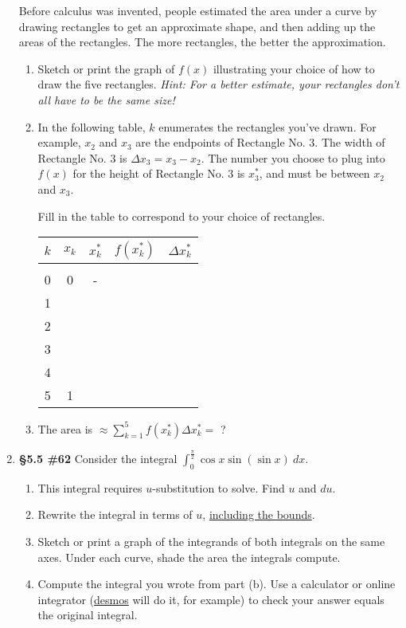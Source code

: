 \documentclass[%
]{article}
\begin{document}
\begin{enumerate}
\hspace{5pt} Before calculus was invented, people estimated the area under a curve by drawing rectangles to get an approximate shape, and then adding up the areas of the rectangles.  The more rectangles, the better the approximation.
  
	\begin{enumerate}
	\item Sketch or print the graph of $f(x)$ illustrating your choice of how to draw the five rectangles.  \textit{Hint: For a better estimate, your rectangles don't all have to be the same size!}
	\item In the following table, $k$ enumerates the rectangles you've drawn.  For example, $x_2$ and $x_3$ are the endpoints of Rectangle No. 3.  The width of Rectangle No. 3 is $\Delta x_3=x_3-x_2$.  The number you choose to plug into $f(x)$ for the height of Rectangle No. 3 is $x_3^*$, and must be between $x_2$ and $x_3$.  
	
	\vspace{0.5pc}
	Fill in the table to correspond to your choice of rectangles.
	\begin{center}
	\begin{tabular}{c | c | c | c | c}
	$k$ & $x_k$ & $x_k^*$ & $f(x_k^*)$ & $\Delta x_k^*$ \\[0.25pc]
	\hline
	 & & & & \\[-0.75pc]
	0 & 0 & - & & \\[0.25pc]
	1 & & & & \\[0.25pc]
	2 & & & & \\[0.25pc]
	3 & & & & \\[0.25pc]
	4 & & & & \\[0.25pc]
	5 & 1 & & & 
	\end{tabular}
	\end{center}
	
	\item The area is $\displaystyle \approx \sum_{k=1}^5f(x_k^*)\Delta x_k^*=$ ?
	
	\end{enumerate}
	
\item {\bf \S5.5 \#62} Consider the integral $\displaystyle \int_0^{\frac{\pi}{2}}\cos x \sin(\sin x)\ dx$. 
	\begin{enumerate}
	\item This integral requires $u$-substitution to solve.  Find $u$ and $du$.
	\item Rewrite the integral in terms of $u$, \underline{including the bounds}.
	\item Sketch or print a graph of the integrands of both integrals on the same axes.  Under each curve, shade the area the integrals compute.  
	\item Compute the integral you wrote from part (b).  Use a calculator or online integrator (\url{desmos} will do it, for example) to check your answer equals the original integral.
	\end{enumerate}
	
\end{enumerate}
\end{document}
